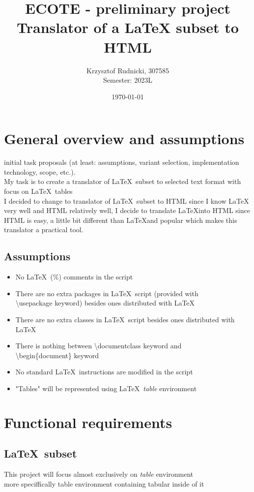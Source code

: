 \documentclass[12pt]{article}
\date{\today}
\title{ECOTE - preliminary project \\ 
Translator of a LaTeX subset to HTML
}
\author{Krzysztof Rudnicki, 307585 \\
Semester: 2023L}
\begin{document}
\maketitle
\section{General overview and assumptions}
initial task proposals (at least: assumptions, variant selection, implementation technology, scope, etc.). \\
My task is to create a translator of \LaTeX \, subset to selected text format with focus on \LaTeX \, tables \\ 
I decided to change to translator of \LaTeX \, subset to HTML since I know \LaTeX \, very well and HTML relatively well, I decide to translate \LaTeX into HTML since HTML is easy, a little bit different than \LaTeX and popular which makes this translator a practical tool.
\subsection{Assumptions}
\begin{itemize}
    \item No \LaTeX \, (\%) comments in the script 
    \item There are no extra packages in \LaTeX \, script (provided with \\ \textbackslash usepackage keyword) besides ones distributed with \LaTeX
    \item There are no extra classes in \LaTeX \, script besides ones distributed with \LaTeX
    \item There is nothing between \textbackslash documentclass keyword and \\ \textbackslash begin\{document\} keyword 
    \item No standard \LaTeX \, instructions are modified in the script
    \item "Tables" will be represented using \LaTeX \, \emph{table} environment 
\end{itemize}
\section{Functional requirements}
\subsection{\LaTeX \, subset}
This project will focus almost exclusively on \emph{table} environment \\
more speciffically table environment containing tabular inside of it 
\end{document}

